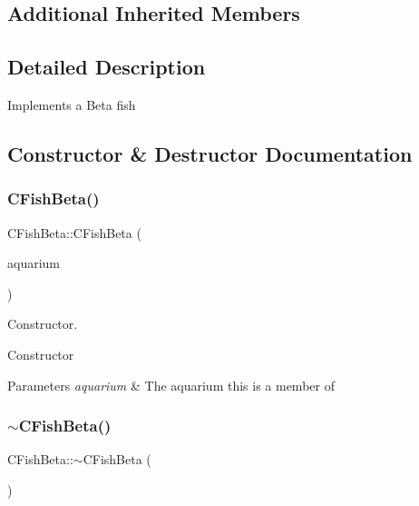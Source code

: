 \subsection*{Additional Inherited Members}


\subsection{Detailed Description}
Implements a Beta fish 

\subsection{Constructor \& Destructor Documentation}
\mbox{\label{class_c_fish_beta_a021073e2e0034271cd7e776b1e3fed29}} 
\subsubsection{\texorpdfstring{C\+Fish\+Beta()}{CFishBeta()}}
{\footnotesize\ttfamily C\+Fish\+Beta\+::\+C\+Fish\+Beta (\begin{DoxyParamCaption}\item[{\hyperlink{class_c_aquarium}{C\+Aquarium} $\ast$}]{aquarium }\end{DoxyParamCaption})}



Constructor. 

Constructor 
\begin{DoxyParams}{Parameters}
{\em aquarium} & The aquarium this is a member of \\
\hline
\end{DoxyParams}
\mbox{\label{class_c_fish_beta_abd932894ad25a70f03c79c4f0f00fff4}} 
\subsubsection{\texorpdfstring{$\sim$\+C\+Fish\+Beta()}{~CFishBeta()}}
{\footnotesize\ttfamily C\+Fish\+Beta\+::$\sim$\+C\+Fish\+Beta (\begin{DoxyParamCaption}{ }\end{DoxyParamCaption})\hspace{0.3cm}{\ttfamily [virtual]}}



